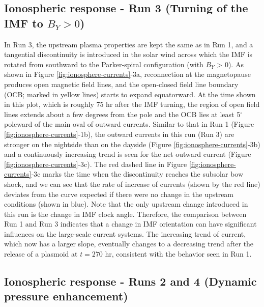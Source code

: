 \subsection{Ionospheric response - Run 3 (Turning of the IMF to \texorpdfstring{$B_Y > 0$}{By>0}) }

In Run 3, the upstream plasma properties are kept the same as in Run 1, and a tangential discontinuity is introduced in the solar wind across which the IMF is rotated from southward to the Parker‐spiral configuration (with $B_Y$ > 0). As shown in Figure \ref{fig:ionosphere-currents}‐3a, reconnection at the magnetopause produces open magnetic field lines, and the open‐closed field line boundary (OCB; marked in yellow lines) starts to expand equatorward. At the time shown in this plot, which is roughly 75 hr after the IMF turning, the region of open field lines extends about a few degrees from the pole and the OCB lies at least 5$^\circ$ poleward of the main oval of outward currents. Similar to that in Run 1 (Figure \ref{fig:ionosphere-currents}‐1b), the outward currents in this run (Run 3) are stronger on the nightside than on the dayside (Figure \ref{fig:ionosphere-currents}‐3b) and a continuously increasing trend is seen for the net outward current (Figure \ref{fig:ionosphere-currents}‐3c). The red dashed line in Figure \ref{fig:ionosphere-currents}‐3c marks the time when the discontinuity reaches the subsolar bow shock, and we can see that the rate of increase of currents (shown by the red line) deviates from the curve expected if there were no change in the upstream conditions (shown in blue). Note that the only upstream change introduced in this run is the change in IMF clock angle. Therefore, the comparison between Run 1 and Run 3 indicates that a change in IMF orientation can have significant influences on the large‐scale current systems. The increasing trend of current, which now has a larger slope, eventually changes to a decreasing trend after the release of a plasmoid at $t = 270$ hr, consistent with the behavior seen in Run 1. 

\subsection{Ionospheric response - Runs 2 and 4 (Dynamic pressure enhancement)}

